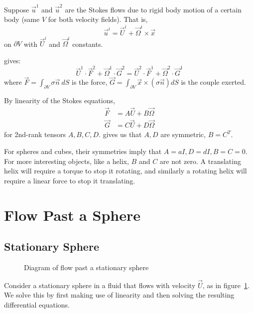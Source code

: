 \documentclass[../Main.tex]{subfiles}
\begin{document}
\begin{example}
    Suppose $\vec{u}^1$ and $\vec{u}^2$ are the Stokes flows due to rigid body motion of a certain body (same $V$ for both velocity fields). That is,
    \begin{equation*}
        \vec{u}^i = \vec{U}^i + \vec{\Omega}^i \times \vec{x}
    \end{equation*}
    on $\partial V$ with $\vec{U}^i$ and $\vec{\Omega}^i$ constants.

     gives:
    \begin{equation}
        \vec{U}^1 \cdot \vec{F}^2 + \vec{\Omega}^1 \cdot \vec{G}^2 = \vec{U}^2 \cdot \vec{F}^1 + \vec{\Omega}^2 \cdot \vec{G}^1
        \label{eqnSolidBodyReciproc}
    \end{equation}
    where $\vec{F} = \int_{\partial V} \sigma\vec{n}~dS$ is the force, $\vec{G} = \int_{\partial V} \vec{x} \times (\sigma \vec{n}) dS$ is the couple exerted.

    By linearity of the Stokes equations,
    \begin{align*}
        \vec{F} &= A\vec{U} + B\vec{\Omega} \\
        \vec{G} &= C\vec{U} + D\vec{\Omega}
    \end{align*}
    for 2nd-rank tensors $A, B, C, D$.  gives us that $A, D$ are symmetric, $B = C^T$.

    For spheres and cubes, their symmetries imply that $A = aI, D = dI, B=C=0$. For more interesting objects, like a helix, $B$ and $C$ are not zero. A translating helix will require a torque to stop it rotating, and similarly a rotating helix will require a linear force to stop it translating.
\end{example}
\section{Flow Past a Sphere}
\subsection{Stationary Sphere}
\label{sscStationarySphere}
\begin{figure}
    \centering
    \caption{Diagram of flow past a stationary sphere}
    \label{figStationarSphere}
\end{figure}
Consider a stationary sphere in a fluid that flows with velocity $\vec{U}$, as in figure~\ref{figStationarSphere}. We solve this by first making use of linearity and then solving the resulting differential equations.
\end{document}
